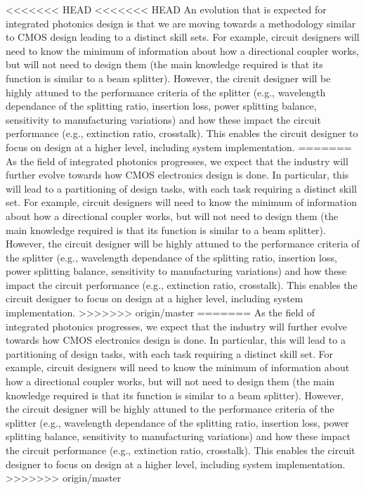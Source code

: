 \documentclass[journal]{spie}
\begin{document}
<<<<<<< HEAD
<<<<<<< HEAD
An evolution that is expected for integrated photonics design is that we are moving towards a methodology similar to CMOS design leading to a distinct skill sets.  For example, circuit designers will need to know the minimum of information about how a directional coupler works, but will not need to design them (the main knowledge required is that its function is similar to a beam splitter).  However, the circuit designer will be highly attuned to the performance criteria of the splitter (e.g., wavelength dependance of the splitting ratio, insertion loss, power splitting balance, sensitivity to manufacturing variations) and how these impact the circuit performance (e.g., extinction ratio, crosstalk).  This enables the circuit designer to focus on design at a higher level, including system implementation.
=======
As the field of integrated photonics progresses, we expect that the industry will further evolve towards how CMOS electronics design is done.  In particular, this will lead to a partitioning of design tasks, with each task requiring a distinct skill set.
For example, circuit designers will need to know the minimum of information about how a directional coupler works, but will not need to design them (the main knowledge required is that its function is similar to a beam splitter).  However, the circuit designer will be highly attuned to the performance criteria of the splitter (e.g., wavelength dependance of the splitting ratio, insertion loss, power splitting balance, sensitivity to manufacturing variations) and how these impact the circuit performance (e.g., extinction ratio, crosstalk).  This enables the circuit designer to focus on design at a higher level, including system implementation.
>>>>>>> origin/master
=======
As the field of integrated photonics progresses, we expect that the industry will further evolve towards how CMOS electronics design is done.  In particular, this will lead to a partitioning of design tasks, with each task requiring a distinct skill set.
For example, circuit designers will need to know the minimum of information about how a directional coupler works, but will not need to design them (the main knowledge required is that its function is similar to a beam splitter).  However, the circuit designer will be highly attuned to the performance criteria of the splitter (e.g., wavelength dependance of the splitting ratio, insertion loss, power splitting balance, sensitivity to manufacturing variations) and how these impact the circuit performance (e.g., extinction ratio, crosstalk).  This enables the circuit designer to focus on design at a higher level, including system implementation.
>>>>>>> origin/master
\end{document}
